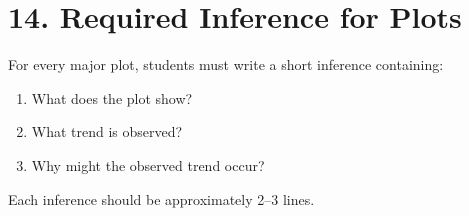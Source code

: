\documentclass[10pt]{article}
\begin{document}
\section*{14. Required Inference for Plots}

For every major plot, students must write a short inference containing:

\begin{enumerate}
\item What does the plot show?
\item What trend is observed?
\item Why might the observed trend occur?
\end{enumerate}

Each inference should be approximately 2--3 lines.

\end{document}
